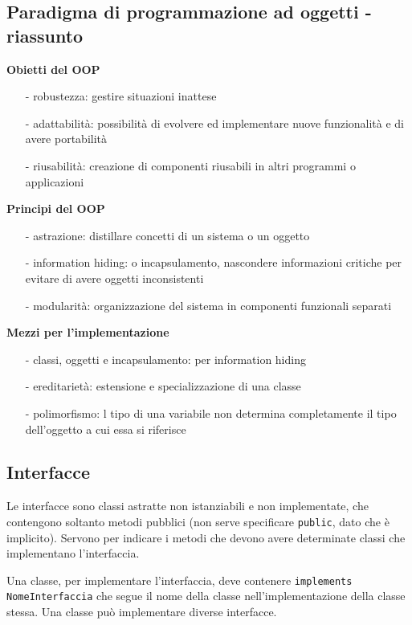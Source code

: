 \documentclass[a4paper]{article}
\begin{document}
\subsection*{Paradigma di programmazione ad oggetti - riassunto}
\textbf{Obietti del OOP}
\begin{itemize} [topsep=3pt, itemsep=0pt]
	\item[-] robustezza: gestire situazioni inattese
	\item[-] adattabilità: possibilità di evolvere ed implementare nuove funzionalità e di avere portabilità
	\item[-] riusabilità: creazione di componenti riusabili in altri programmi o applicazioni
\end{itemize}
\textbf{Principi del OOP}
\begin{itemize} [topsep=3pt, itemsep=0pt]
	\item[-] astrazione: distillare concetti di un sistema o un oggetto
	\item[-] information hiding: o incapsulamento, nascondere informazioni critiche per evitare di avere oggetti inconsistenti
	\item[-] modularità: organizzazione del sistema in componenti funzionali separati
\end{itemize}
\textbf{Mezzi per l'implementazione}
\begin{itemize} [topsep=3pt, itemsep=0pt]
	\item[-] classi, oggetti e incapsulamento: per information hiding
	\item[-] ereditarietà: estensione e specializzazione di una classe
	\item[-] polimorfismo: l tipo di una variabile non determina completamente il tipo dell'oggetto a cui essa si riferisce 
\end{itemize}

\newpage


\subsection{Interfacce}
Le interfacce sono classi astratte non istanziabili e non implementate, che contengono soltanto metodi pubblici (non serve
specificare \verb|public|, dato che è implicito). Servono per indicare i metodi che devono avere determinate classi che
implementano l'interfaccia.

Una classe, per implementare l'interfaccia, deve contenere \verb|implements NomeInterfaccia| che segue il nome della
classe nell'implementazione della classe stessa. Una classe può implementare diverse interfacce.
\end{document}
